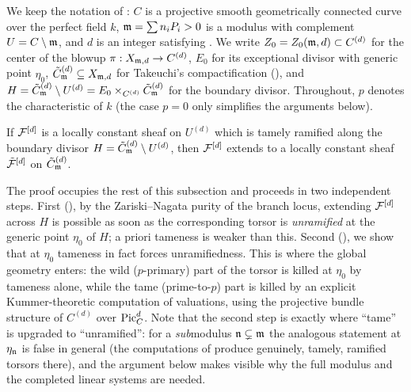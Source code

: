 %

We keep the notation of :
$C$ is a projective smooth geometrically connected curve over the perfect field $k$,
$\mdls = \sum n_i P_i > 0$ is a modulus with complement $U = C \setminus \mdls$,
and $d$ is an integer satisfying .
We write $Z_0 = Z_0(\mdls, d) \subset C^{(d)}$ for the center of the blowup
$\pi : X_{\mdls, d} \to C^{(d)}$, $E_0$ for its exceptional divisor with generic point $\eta_0$,
$\Cmod{d} \subseteq X_{\mdls,d}$ for Takeuchi's compactification
(), and
$H = \Cmod{d} \setminus U^{(d)} = E_0 \times_{C^{(d)}} \Cmod{d}$ for the boundary divisor.
Throughout, $p$ denotes the characteristic of $k$ (the case $p=0$ only simplifies the arguments below).

\begin{lemma}\label{lemma:ExtensionOfTamelyRamifiedSheaf}
    If $\cF^{[d]}$ is a locally constant sheaf on $U^{(d)}$ which is tamely ramified along the boundary divisor $H = \tilde{C}^{(d)}_\mdls \setminus U^{(d)}$,
    then $\cF^{[d]}$ extends to a locally constant sheaf $\tilde{\cF}^{[d]}$ on $\tilde{C}^{(d)}_\mdls$.
\end{lemma}

The proof occupies the rest of this subsection and proceeds in two independent steps.
First (), by the Zariski--Nagata purity of the branch locus,
extending $\cF^{[d]}$ across $H$ is possible as soon as the corresponding torsor is
\emph{unramified} at the generic point $\eta_0$ of $H$; a priori tameness is weaker than this.
Second (), we show that at $\eta_0$
tameness in fact forces unramifiedness. This is where the global geometry enters:
the wild ($p$-primary) part of the torsor is killed at $\eta_0$ by tameness alone,
while the tame (prime-to-$p$) part is killed by an explicit Kummer-theoretic computation of valuations,
using the projective bundle structure of $C^{(d)}$ over $\PicC[d]$.
Note that the second step is exactly where ``tame'' is upgraded to ``unramified'':
for a \emph{sub}modulus $\ndls \subsetneq \mdls$ the analogous statement at $\eta_\ndls$ is false in general
(the computations of  produce genuinely, tamely, ramified torsors there),
and the argument below makes visible why the full modulus and the completed linear systems are needed.

